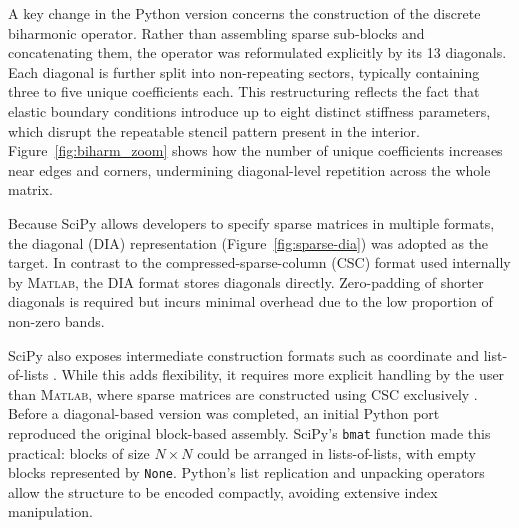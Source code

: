 A key change in the Python version concerns the construction of the discrete biharmonic operator. Rather than assembling sparse sub-blocks and concatenating them, the operator was reformulated explicitly by its 13 diagonals. Each diagonal is further split into non-repeating sectors, typically containing three to five unique coefficients each. This restructuring reflects the fact that elastic boundary conditions introduce up to eight distinct stiffness parameters, which disrupt the repeatable stencil pattern present in the interior. Figure~\ref{fig:biharm_zoom} shows how the number of unique coefficients increases near edges and corners, undermining diagonal-level repetition across the whole matrix.

Because SciPy allows developers to specify sparse matrices in multiple formats, the diagonal (DIA) representation (Figure~\ref{fig:sparse-dia}) was adopted as the target. In contrast to the compressed-sparse-column (CSC) format used internally by M\textsc{atlab}, the DIA format stores diagonals directly. Zero-padding of shorter diagonals is required but incurs minimal overhead due to the low proportion of non-zero bands.

SciPy also exposes intermediate construction formats such as coordinate and list-of-lists \cite{eding_sparse_2019}. While this adds flexibility, it requires more explicit handling by the user than M\textsc{atlab}, where sparse matrices are constructed using CSC exclusively \cite{gilbert_sparse_1992}. Before a diagonal-based version was completed, an initial Python port reproduced the original block-based assembly. SciPy’s \texttt{bmat} function \cite{scipy_bmat_2025} made this practical: blocks of size $N\times N$ could be arranged in lists-of-lists, with empty blocks represented by \texttt{None}. Python’s list replication and unpacking operators allow the structure to be encoded compactly, avoiding extensive index manipulation.

